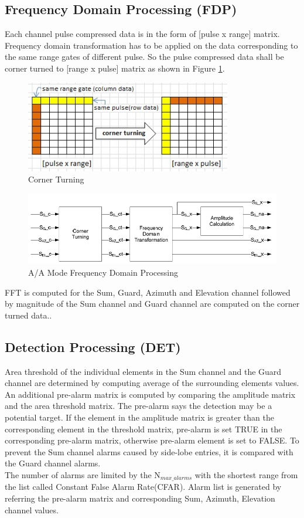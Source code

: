 \subsection{Frequency Domain Processing (FDP)}
Each channel pulse compressed data is in the form of [pulse x range] matrix. Frequency domain transformation has to be applied on the data corresponding to the same range gates of different pulse. So the pulse compressed data shall be corner turned to [range x pulse] matrix as shown in Figure \ref{fig:bg_related_work:cot}.

\begin{figure}[h!]
	\centering
	\includegraphics[width=90mm]{figures/cot}
	\caption{Corner Turning}
	\label{fig:bg_related_work:cot}
\end{figure}
\FloatBarrier
\begin{figure}[h!]
	\centering
	\includegraphics[width=140mm]{figures/aa_fdp}
	\caption{A/A Mode Frequency Domain Processing}
	\label{fig:bg_related_work:aa_fdp}
\end{figure}
FFT is computed for the Sum, Guard, Azimuth and Elevation channel followed by magnitude of the Sum channel and Guard channel are computed on the corner turned data..

\subsection{Detection Processing (DET)}
Area threshold of the individual elements in the Sum channel and the Guard channel are determined by computing average of the surrounding elements values. An additional pre-alarm matrix is computed by comparing the amplitude matrix and the area threshold matrix. The pre-alarm says the detection may be a potential target. If the element in the amplitude matrix is greater than the corresponding element in the threshold matrix, pre-alarm is set TRUE in the corresponding pre-alarm matrix, otherwise pre-alarm element is set to FALSE. To prevent the Sum channel alarms caused by side-lobe entries, it is compared with the Guard channel alarms. \\The number of alarms are limited by the N$_{max\_alarms}$ with the shortest range from the list called Constant False Alarm Rate(CFAR). Alarm list is generated by referring the pre-alarm matrix and corresponding Sum, Azimuth, Elevation channel values.

